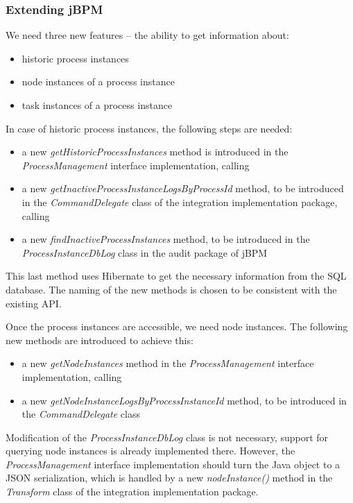 \subsubsection*{Extending jBPM}

We need three new features -- the ability to get information about:

\begin{itemize}
\item historic process instances
\item node instances of a process instance
\item task instances of a process instance
\end{itemize}

In case of historic process instances, the following steps are needed:


\begin{itemize}
\item a new \emph{getHistoricProcessInstances} method is introduced in the \emph{ProcessManagement} interface implementation, calling
\item a new \emph{getInactiveProcessInstanceLogsByProcessId} method, to be introduced in the \emph{CommandDelegate} class of the integration implementation package, calling
\item a new \emph{findInactiveProcessInstances} method, to be introduced in the \emph{ProcessInstanceDbLog} class in the audit package of jBPM
\end{itemize}

This last method uses Hibernate to get the necessary information from the SQL
database. The naming of the new methods is chosen to be consistent with the
existing API.

Once the process instances are accessible, we need node instances. The
following new methods are introduced to achieve this:

\begin{itemize}
\item a new \emph{getNodeInstances} method in the \emph{ProcessManagement} interface implementation, calling
\item a new \emph{getNodeInstanceLogsByProcessInstanceId} method, to be introduced in the \emph{CommandDelegate} class
\end{itemize}

Modification of the \emph{ProcessInstanceDbLog} class is not necessary, support
for querying node instances is already implemented there. However, the
\emph{ProcessManagement} interface implementation should turn the Java object
to a JSON serialization, which is handled by a new \emph{nodeInstance()} method
in the \emph{Transform} class of the integration implementation package.

